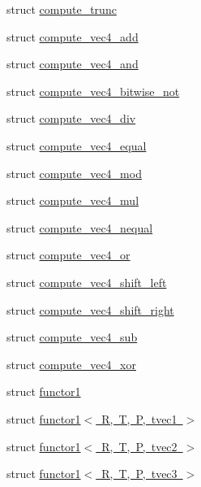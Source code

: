 \begin{DoxyCompactItemize}
\item 
struct \mbox{\hyperlink{structglm_1_1detail_1_1compute__trunc}{compute\+\_\+trunc}}
\item 
struct \mbox{\hyperlink{structglm_1_1detail_1_1compute__vec4__add}{compute\+\_\+vec4\+\_\+add}}
\item 
struct \mbox{\hyperlink{structglm_1_1detail_1_1compute__vec4__and}{compute\+\_\+vec4\+\_\+and}}
\item 
struct \mbox{\hyperlink{structglm_1_1detail_1_1compute__vec4__bitwise__not}{compute\+\_\+vec4\+\_\+bitwise\+\_\+not}}
\item 
struct \mbox{\hyperlink{structglm_1_1detail_1_1compute__vec4__div}{compute\+\_\+vec4\+\_\+div}}
\item 
struct \mbox{\hyperlink{structglm_1_1detail_1_1compute__vec4__equal}{compute\+\_\+vec4\+\_\+equal}}
\item 
struct \mbox{\hyperlink{structglm_1_1detail_1_1compute__vec4__mod}{compute\+\_\+vec4\+\_\+mod}}
\item 
struct \mbox{\hyperlink{structglm_1_1detail_1_1compute__vec4__mul}{compute\+\_\+vec4\+\_\+mul}}
\item 
struct \mbox{\hyperlink{structglm_1_1detail_1_1compute__vec4__nequal}{compute\+\_\+vec4\+\_\+nequal}}
\item 
struct \mbox{\hyperlink{structglm_1_1detail_1_1compute__vec4__or}{compute\+\_\+vec4\+\_\+or}}
\item 
struct \mbox{\hyperlink{structglm_1_1detail_1_1compute__vec4__shift__left}{compute\+\_\+vec4\+\_\+shift\+\_\+left}}
\item 
struct \mbox{\hyperlink{structglm_1_1detail_1_1compute__vec4__shift__right}{compute\+\_\+vec4\+\_\+shift\+\_\+right}}
\item 
struct \mbox{\hyperlink{structglm_1_1detail_1_1compute__vec4__sub}{compute\+\_\+vec4\+\_\+sub}}
\item 
struct \mbox{\hyperlink{structglm_1_1detail_1_1compute__vec4__xor}{compute\+\_\+vec4\+\_\+xor}}
\item 
struct \mbox{\hyperlink{structglm_1_1detail_1_1functor1}{functor1}}
\item 
struct \mbox{\hyperlink{structglm_1_1detail_1_1functor1_3_01_r_00_01_t_00_01_p_00_01tvec1_01_4}{functor1$<$ R, T, P, tvec1 $>$}}
\item 
struct \mbox{\hyperlink{structglm_1_1detail_1_1functor1_3_01_r_00_01_t_00_01_p_00_01tvec2_01_4}{functor1$<$ R, T, P, tvec2 $>$}}
\item 
struct \mbox{\hyperlink{structglm_1_1detail_1_1functor1_3_01_r_00_01_t_00_01_p_00_01tvec3_01_4}{functor1$<$ R, T, P, tvec3 $>$}}

\end{DoxyCompactItemize}
